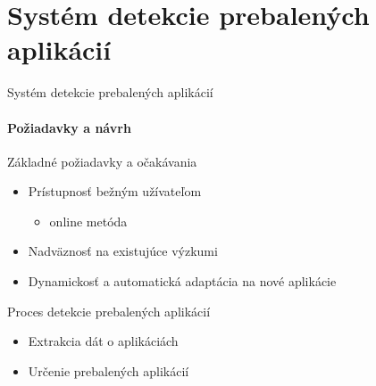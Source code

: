 \documentclass{beamer}
\begin{document}
  \section{Systém detekcie prebalených aplikácií}  
  
  \begin{frame}[label=lists]{Systém detekcie prebalených aplikácií}
 	 \framesubtitle{Požiadavky a návrh}
 	Základné požiadavky a očakávania
	\begin{itemize}
	 	\item Prístupnosť bežným užívateľom
	 		\begin{itemize}
	 			\item online metóda
	 		\end{itemize}
	 	\item Nadväznosť na existujúce výzkumi
	 	\item Dynamickosť a automatická adaptácia na nové aplikácie
	\end{itemize}
	Proces detekcie prebalených aplikácií
	\begin{itemize}
 	\item Extrakcia dát o aplikáciách
 	\item Určenie prebalených aplikácií
   \end{itemize}
  \end{frame} 
  
\end{document}
